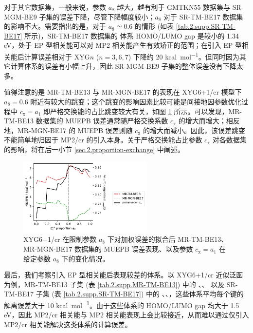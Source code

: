 对于其它数据集，一般来说，参数 $a_8$ 越大，越有利于 GMTKN55 数据集与 SR-MGM-BE9 子集的误差下降，尽管下降幅度较小；$a_8$ 对于 SR-TM-BE17 数据集的影响不大。需要指出的是，对于 $a_8 \simeq 0.6$ 的情形 (如表 \ref{tab.2.supp.SR-TM-BE17} 所示)，SR-TM-BE17 数据集的  体系 HOMO/LUMO gap 是较小的 1.34 eV，处于 EP 型相关能可以对 MP2 相关能产生有效矫正的范围；在引入 EP 型相关能后计算误差相对于 XYG$n$ ($n=3,6,7$) 下降约 20 \si{kcal.mol^{-1}}。但同时因为其它计算体系的误差有小幅上升，因此 SR-MGM-BE9 子集的整体误差没有下降太多。

值得注意的是 MR-TM-BE13 与 MR-MGN-BE17 的表现在 XYG6+1/cr 模型下 $a_8 = 0.6$ 附近有较大的跳变；这个跳变的影响因素比较可能是间接地因参数优化过程中 $c_\mathrm{x} = a_1$ 即严格交换能的占比跳变较大有关，如图 \ref{fig.2.plot-seq-cr-against-cx} 所示。可以发现，MR-TM-BE13 数据集的 MUEPB 误差通常随严格交换系数 $c_\mathrm{x}$ 的增大而增大；相反地，MR-MGN-BE17 的 MUEPB 误差则随 $c_\mathrm{x}$ 的增大而减小。因此，该误差跳变不能简单地归因于 MP2/cr 的引入本身。关于严格交换能占比参数 $c_\mathrm{x}$ 对各数据集的影响，将在后一小节 \ref{sec.2.proportion-exchange} 中阐述。

\begin{figure}[h]
  \centering
  \includegraphics[width=0.6\textwidth]{assets/plot-seq-cr-against-cx.pdf}
  \caption[XYG6+1/cr 在限制参数 $E_\mathrm{c}^\textmt{EP}$ 占比系数下误差与 $E_\mathrm{x}^\textmt{exact}$ 系数表现]{XYG6+1/cr 在限制参数 $a_8$ 下对加权误差的拟合后 MR-TM-BE13、MR-MGN-BE17 数据集的 MUEPB 误差表现、以及参数 $c_\mathrm{x} = a_1$ 在给定参数 $a_8$ 下的变化情况。}
  \label{fig.2.plot-seq-cr-against-cx}
\end{figure}

最后，我们考察引入 EP 型相关能后表现较差的体系。以 XYG6+1/cr 近似泛函为例，MR-TM-BE13 子集 (表 \ref{tab.2.supp.MR-TM-BE13}) 中的 、、 以及 SR-TM-BE17 子集 (表 \ref{tab.2.supp.SR-TM-BE17}) 中的 、、，这些体系平均每个键的解离误差大于 10 \si{kcal.mol^{-1}}。由于这些体系的 HOMO/LUMO gap 均大于 1.5 eV，因此 MP2/cr 相关能与 MP2 相关能表现上会比较接近，从而难以通过仅引入 MP2/cr 相关能解决这类体系的计算误差。

